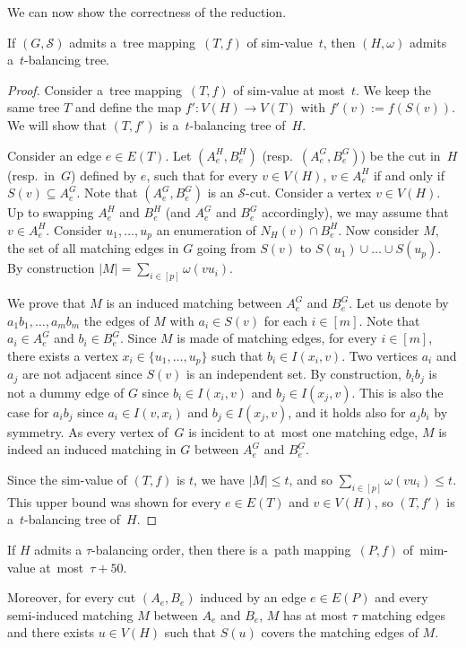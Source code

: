 \documentclass[a4paper,UKenglish,cleveref,hyperref,autoref]{lipics-v2021}
\newcommand{\weight}{\omega}
\newcommand{\tmap}{tree mapping\xspace}
\newcommand{\pmap}{path mapping\xspace}
\begin{document}
We can now show the correctness of the reduction.

\begin{lemma}\label{lem:simwidth2balanced}
If $(G, \mathcal S)$ admits a~\tmap~$(T, f)$ of sim-value~$t$, then $(H,\weight)$ admits a~$t$-balancing tree.
\end{lemma}
\begin{proof}
Consider a~\tmap~$(T, f)$ of sim-value at most~$t$.
We keep the same tree $T$ and define the map $f': V(H) \rightarrow V(T)$ with $f'(v) := f(S(v))$.
We will show that $(T, f')$ is a~$t$-balancing tree of~$H$.

Consider an edge $e \in E(T)$.
Let $(A_e^H, B_e^H)$ (resp.~$(A_e^G, B_e^G)$) be the cut in~$H$ (resp.~in~$G$) defined by $e$, such that for every $v \in V(H)$, $v \in A_e^H$ if and only if $S(v) \subseteq A_e^G$.
Note that $(A_e^G, B_e^G)$ is an $\mathcal S$-cut.
Consider a vertex $v \in V(H)$.
Up to swapping $A_e^H$ and $B_e^H$ (and $A_e^G$ and $B_e^G$ accordingly), we may assume that $v \in A_e^H$.
Consider $u_1, \ldots, u_p$ an enumeration of $N_H(v) \cap B_e^H$.
Now consider $M$, the set of all matching edges in $G$ going from $S(v)$ to $S(u_1) \cup \dots \cup S(u_p)$.
By construction $|M| = \sum_{i \in [p]} \weight(vu_i)$.

We prove that $M$ is an induced matching between $A_e^G$ and $B_e^G$.
Let us denote by $a_1b_1, \ldots, a_mb_m$ the edges of $M$ with $a_i \in S(v)$ for each $i \in [m]$.
Note that $a_i \in A_e^G$ and $b_i \in B_e^G$.
Since $M$ is made of matching edges, for every $i\in [m]$, there exists a vertex $x_i \in \{u_1,\dots,u_p\}$ such that $b_i \in I(x_i, v)$.
Two vertices $a_i$ and $a_j$ are not adjacent since $S(v)$ is an independent set.
By construction, $b_ib_j$ is not a dummy edge of $G$ since $b_i \in I(x_i, v)$ and $b_j \in I(x_j, v)$.  
This is also the case for $a_ib_j$ since $a_i \in I(v, x_i)$ and $b_j \in I(x_j, v)$, and it holds also for $a_jb_i$ by symmetry.
As every vertex of~$G$ is incident to at~most one matching edge, $M$ is indeed an induced matching in $G$ between $A_e^G$ and $B_e^G$.

Since the sim-value of $(T, f)$ is $t$, we have $|M| \leqslant t$, and so $\sum_{i \in [p]} \weight(vu_i) \leqslant t$.
This upper bound was shown for every $e \in E(T)$ and $v \in V(H)$, so $(T, f')$ is a~$t$-balancing tree of~$H$.
\end{proof}

\begin{lemma}\label{lem:balanced2sim-width}
If $H$ admits a $\tau$-balancing order, then there is a~\pmap~$(P, f)$ of~mim-value at~most~$\tau + 50$.

Moreover, for every cut $(A_e, B_e)$ induced by an edge $e\in E(P)$ and every semi-induced matching $M$ between $A_e$ and $B_e$, $M$ has at most $\tau$ matching edges and there exists $u\in V(H)$ such that $S(u)$ covers the matching edges of $M$.
\end{lemma}
\end{document}
